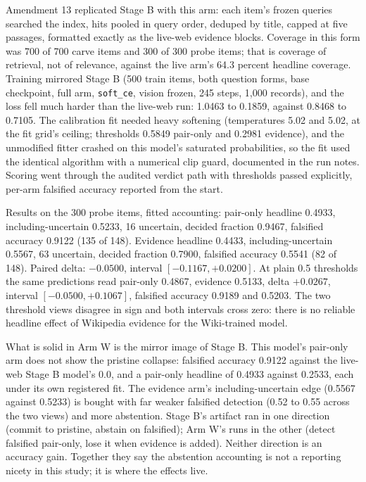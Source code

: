 \documentclass{article} %
\begin{document}
Amendment 13 replicated Stage B with this arm: each item's frozen queries searched the index, hits pooled in query order, deduped by title, capped at five passages, formatted exactly as the live-web evidence blocks. Coverage in this form was 700 of 700 carve items and 300 of 300 probe items; that is coverage of retrieval, not of relevance, against the live arm's 64.3 percent headline coverage. Training mirrored Stage B (500 train items, both question forms, base checkpoint, full arm, \texttt{soft\_ce}, vision frozen, 245 steps, 1,000 records), and the loss fell much harder than the live-web run: 1.0463 to 0.1859, against 0.8468 to 0.7105. The calibration fit needed heavy softening (temperatures 5.02 and 5.02, at the fit grid's ceiling; thresholds 0.5849 pair-only and 0.2981 evidence), and the unmodified fitter crashed on this model's saturated probabilities, so the fit used the identical algorithm with a numerical clip guard, documented in the run notes. Scoring went through the audited verdict path with thresholds passed explicitly, per-arm falsified accuracy reported from the start.

Results on the 300 probe items, fitted accounting: pair-only headline 0.4933, including-uncertain 0.5233, 16 uncertain, decided fraction 0.9467, falsified accuracy 0.9122 (135 of 148). Evidence headline 0.4433, including-uncertain 0.5567, 63 uncertain, decided fraction 0.7900, falsified accuracy 0.5541 (82 of 148). Paired delta: \(-0.0500\), interval \([-0.1167, +0.0200]\). At plain 0.5 thresholds the same predictions read pair-only 0.4867, evidence 0.5133, delta \(+0.0267\), interval \([-0.0500, +0.1067]\), falsified accuracy 0.9189 and 0.5203. The two threshold views disagree in sign and both intervals cross zero: there is no reliable headline effect of Wikipedia evidence for the Wiki-trained model.

What is solid in Arm W is the mirror image of Stage B. This model's pair-only arm does not show the pristine collapse: falsified accuracy 0.9122 against the live-web Stage B model's 0.0, and a pair-only headline of 0.4933 against 0.2533, each under its own registered fit. The evidence arm's including-uncertain edge (0.5567 against 0.5233) is bought with far weaker falsified detection (0.52 to 0.55 across the two views) and more abstention. Stage B's artifact ran in one direction (commit to pristine, abstain on falsified); Arm W's runs in the other (detect falsified pair-only, lose it when evidence is added). Neither direction is an accuracy gain. Together they say the abstention accounting is not a reporting nicety in this study; it is where the effects live.
\end{document}
